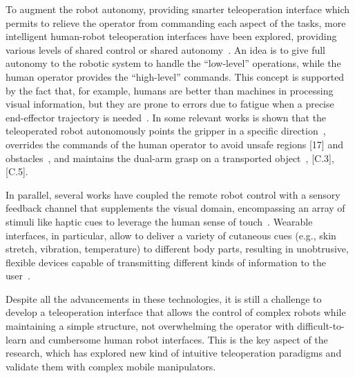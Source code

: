 To augment the robot autonomy, providing smarter teleoperation interface which permits to relieve the operator from commanding each aspect of the tasks, more intelligent human-robot teleoperation interfaces have been explored, providing various levels of shared control or shared autonomy~\cite{Selvaggio2021}. An idea is to give full autonomy to the robotic system to handle the \enquote{low-level} operations, while the human operator provides the \enquote{high-level} commands. This concept is supported by the fact that, for example, humans are better than machines in processing visual information, but they are prone to errors due to fatigue when a precise end-effector trajectory is needed~\cite{Yang2018}⁠. In some relevant works is shown that the teleoperated robot autonomously points the gripper in a specific direction~\cite{Abi2016}, overrides the commands of the human operator to avoid unsafe regions [17] and obstacles~\cite{Masone2018}, and maintains the dual-arm grasp on a transported object~\cite{Shahbazi2017, Laghi2018}, [C.3], [C.5].

In parallel, several works have coupled the remote robot control with a sensory feedback channel that supplements the visual domain, encompassing an array of stimuli like haptic cues to leverage the human sense of touch~\cite{Dargahi2004, Pacchierotti2015}. Wearable interfaces, in particular, allow to deliver a variety of cutaneous cues (e.g., skin stretch, vibration, temperature) to different body parts, resulting in unobtrusive, flexible devices capable of transmitting different kinds of information to the user~\cite{pacchierotti2017wearable}. 
%

Despite all the advancements in these technologies, it is still a challenge to develop a teleoperation interface that allows the control of complex robots while maintaining a simple structure, not overwhelming the operator with difficult-to-learn and cumbersome human robot interfaces. This is the key aspect of the research, which has explored new kind of intuitive teleoperation paradigms and validate them with complex mobile manipulators.